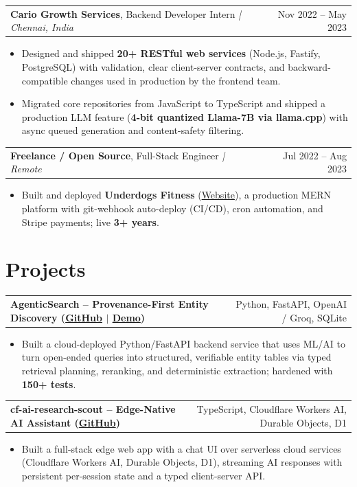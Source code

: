 \documentclass[letterpaper,11pt]{article}
\makeatletter
\newcommand{\expItem}[4]{%
  \vspace{3pt}
  \begin{tabular*}{\textwidth}{@{}l@{\extracolsep{\fill}}r@{}}
    \textbf{#1}, #2 \textit{| #3} & #4 \\
  \end{tabular*}\par\vspace{-2pt}
}
\newcommand{\projItem}[2]{%
  \vspace{6pt}
  \begin{tabular*}{\textwidth}{@{}l@{\extracolsep{\fill}}r@{}}
    \textbf{#1} & #2 \\
  \end{tabular*}\par\vspace{-2pt}
}
\makeatother
\begin{document}
\expItem{Cario Growth Services}{Backend Developer Intern}{Chennai, India}{Nov 2022 -- May 2023}
\begin{itemize}
  \item Designed and shipped \textbf{20+ RESTful web services} (Node.js, Fastify, PostgreSQL) with validation, clear client-server contracts, and backward-compatible changes used in production by the frontend team.
  \item Migrated core repositories from JavaScript to TypeScript and shipped a production LLM feature (\textbf{4-bit quantized Llama-7B via llama.cpp}) with async queued generation and content-safety filtering.
\end{itemize}

\expItem{Freelance / Open Source}{Full-Stack Engineer}{Remote}{Jul 2022 -- Aug 2023}
\begin{itemize}
  \item Built and deployed \textbf{Underdogs Fitness} (\href{https://www.underdogsfitness.in/}{Website}), a production MERN platform with git-webhook auto-deploy (CI/CD), cron automation, and Stripe payments; live \textbf{3+ years}.
\end{itemize}

\section{Projects}

\projItem{AgenticSearch -- Provenance-First Entity Discovery {\normalfont\small(\href{https://github.com/Deva-1903/ciir_agentic_search}{GitHub} $\vert$ \href{https://agentic-search-negglszkwa-uc.a.run.app}{Demo})}}{Python, FastAPI, OpenAI / Groq, SQLite}
\begin{itemize}
  \item Built a cloud-deployed Python/FastAPI backend service that uses ML/AI to turn open-ended queries into structured, verifiable entity tables via typed retrieval planning, reranking, and deterministic extraction; hardened with \textbf{150+ tests}.
\end{itemize}

\projItem{cf-ai-research-scout -- Edge-Native AI Assistant {\normalfont\small(\href{https://github.com/Deva-1903/cf_ai_research_scout}{GitHub})}}{TypeScript, Cloudflare Workers AI, Durable Objects, D1}
\begin{itemize}
  \item Built a full-stack edge web app with a chat UI over serverless cloud services (Cloudflare Workers AI, Durable Objects, D1), streaming AI responses with persistent per-session state and a typed client-server API.
\end{itemize}
\end{document}
